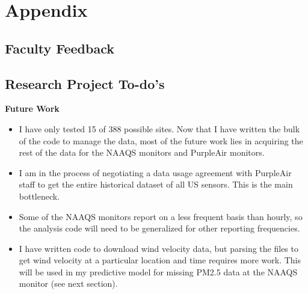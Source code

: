 \documentclass[12pt]{article}
\begin{document}
\newpage


% 
%



\newpage
\section{Appendix}

\subsection{Faculty Feedback} \label{sec:faculty_feedback}



\newpage
\subsection{Research Project To-do's} \label{sec:todo}
\textbf{Future Work}
\begin{itemize}
    \item I have only tested 15 of 388 possible sites. Now that I have written the bulk of the code to manage the data, most of the future work lies in acquiring the rest of the data for the NAAQS monitors and PurpleAir monitors.
    \item I am in the process of negotiating a data usage agreement with PurpleAir staff to get the entire historical dataset of all US sensors. This is the main bottleneck.
    \item Some of the NAAQS monitors report on a less frequent basis than hourly, so the analysis code will need to be generalized for other reporting frequencies.
    \item I have written code to download wind velocity data, but parsing the files to get wind velocity at a particular location and time requires more work. This will be used in my predictive model for missing PM2.5 data at the NAAQS monitor (see next section).
\end{itemize}
\end{document}
